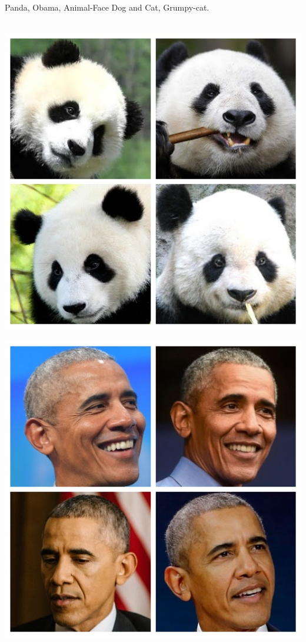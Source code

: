 \documentclass[12pt]{article}
\begin{document}
Panda, Obama, Animal-Face Dog and Cat,
Grumpy-cat.\\\\
\begin{minipage}[t]{0.2\textwidth}
	\includegraphics[width=1\textwidth]{Images/panda.jpg}
\end{minipage}
\begin{minipage}[t]{0.2\textwidth} 
	\includegraphics[width=1\textwidth]{Images/obama.jpg}
\end{minipage}
\end{document}
